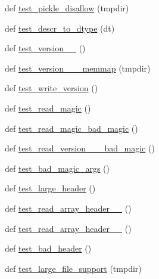 \begin{DoxyCompactItemize}
\item 
def \hyperlink{namespacenumpy_1_1lib_1_1tests_1_1test__format_a01b790e68cb07100afbc60f605b24b25}{test\+\_\+pickle\+\_\+disallow} (tmpdir)
\item 
def \hyperlink{namespacenumpy_1_1lib_1_1tests_1_1test__format_a565f3bb23f7103954d9269cced220ab2}{test\+\_\+descr\+\_\+to\+\_\+dtype} (dt)
\item 
def \hyperlink{namespacenumpy_1_1lib_1_1tests_1_1test__format_ab2a2312a54d3218b4f35433df7082342}{test\+\_\+version\+\_\+\_} ()
\item 
def \hyperlink{namespacenumpy_1_1lib_1_1tests_1_1test__format_ac1a3eaae46944a4390576decf0f8b17d}{test\+\_\+version\+\_\+\_\+\_\+memmap} (tmpdir)
\item 
def \hyperlink{namespacenumpy_1_1lib_1_1tests_1_1test__format_a7f37ddd0374084c44291d811ee611a64}{test\+\_\+write\+\_\+version} ()
\item 
def \hyperlink{namespacenumpy_1_1lib_1_1tests_1_1test__format_a48bfa0450a0238ab5ce9d089507a668c}{test\+\_\+read\+\_\+magic} ()
\item 
def \hyperlink{namespacenumpy_1_1lib_1_1tests_1_1test__format_a8e96e3a0879d1c730c57353aa5fcc604}{test\+\_\+read\+\_\+magic\+\_\+bad\+\_\+magic} ()
\item 
def \hyperlink{namespacenumpy_1_1lib_1_1tests_1_1test__format_abf9616665ddef6644362927da9ad1b43}{test\+\_\+read\+\_\+version\+\_\+\_\+\_\+bad\+\_\+magic} ()
\item 
def \hyperlink{namespacenumpy_1_1lib_1_1tests_1_1test__format_a2b372699bf87753240797658f39e4d80}{test\+\_\+bad\+\_\+magic\+\_\+args} ()
\item 
def \hyperlink{namespacenumpy_1_1lib_1_1tests_1_1test__format_ac8b6f858386e20fcef446abda4db7e0f}{test\+\_\+large\+\_\+header} ()
\item 
def \hyperlink{namespacenumpy_1_1lib_1_1tests_1_1test__format_a1ac9f1b48506d357571a0e5f6f6c4f0b}{test\+\_\+read\+\_\+array\+\_\+header\+\_\+\_} ()
\item 
def \hyperlink{namespacenumpy_1_1lib_1_1tests_1_1test__format_a0699f43c71195c661ddd2f97ca102ff9}{test\+\_\+read\+\_\+array\+\_\+header\+\_\+\_} ()
\item 
def \hyperlink{namespacenumpy_1_1lib_1_1tests_1_1test__format_ae72b433321db551ef058558322aed868}{test\+\_\+bad\+\_\+header} ()
\item 
def \hyperlink{namespacenumpy_1_1lib_1_1tests_1_1test__format_a596ab1409f2103e983cabb35452867eb}{test\+\_\+large\+\_\+file\+\_\+support} (tmpdir)

\end{DoxyCompactItemize}
